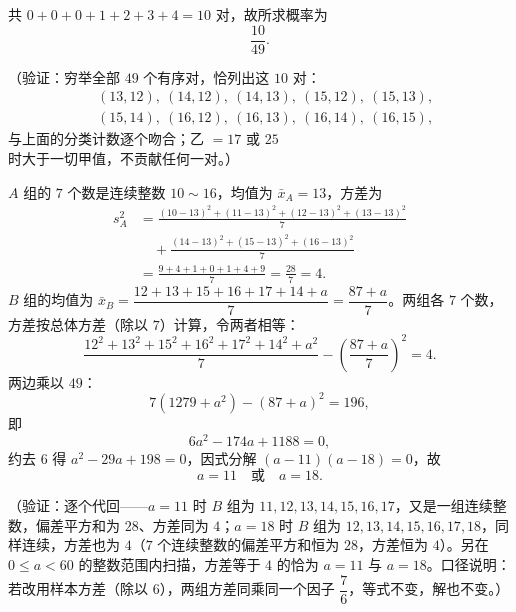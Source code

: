 \begin{answer}
共 \(0+0+0+1+2+3+4=10\) 对，故所求概率为
\nopagebreak[4]
\[
\frac{10}{49}.
\]

（验证：穷举全部 \(49\) 个有序对，恰列出这 \(10\) 对：
\nopagebreak[4]
\[
\begin{aligned}
&(13,12),\ (14,12),\ (14,13),\ (15,12),\ (15,13),\\
&(15,14),\ (16,12),\ (16,13),\ (16,14),\ (16,15),
\end{aligned}
\]
与上面的分类计数逐个吻合；乙 \(=17\) 或 \(25\) 时大于一切甲值，不贡献任何一对。）


\(A\) 组的 \(7\) 个数是连续整数 \(10\sim16\)，均值为 \(\bar{x}_{A}=13\)，方差为
\nopagebreak[4]
\[
\begin{aligned}
s_{A}^{2}&=\frac{(10-13)^{2}+(11-13)^{2}+(12-13)^{2}+(13-13)^{2}}{7}\\
&\quad+\frac{(14-13)^{2}+(15-13)^{2}+(16-13)^{2}}{7}\\
&=\frac{9+4+1+0+1+4+9}{7}=\frac{28}{7}=4 .
\end{aligned}
\]
\(B\) 组的均值为 \(\bar{x}_{B}=\dfrac{12+13+15+16+17+14+a}{7}=\dfrac{87+a}{7}\)。两组各 \(7\) 个数，方差按总体方差（除以 \(7\)）计算，令两者相等：
\nopagebreak[4]
\[
\frac{12^{2}+13^{2}+15^{2}+16^{2}+17^{2}+14^{2}+a^{2}}{7}-\left(\frac{87+a}{7}\right)^{2}=4 .
\]
两边乘以 \(49\)：
\nopagebreak[4]
\[
7(1279+a^{2})-(87+a)^{2}=196,
\]
即
\nopagebreak[4]
\[
6a^{2}-174a+1188=0,
\]
约去 \(6\) 得 \(a^{2}-29a+198=0\)，因式分解 \((a-11)(a-18)=0\)，故
\nopagebreak[4]
\[
a=11\quad\text{或}\quad a=18 .
\]

（验证：逐个代回——\(a=11\) 时 \(B\) 组为 \(11,12,13,14,15,16,17\)，又是一组连续整数，偏差平方和为 \(28\)、方差同为 \(4\)；\(a=18\) 时 \(B\) 组为 \(12,13,14,15,16,17,18\)，同样连续，方差也为 \(4\)（\(7\) 个连续整数的偏差平方和恒为 \(28\)，方差恒为 \(4\)）。另在 \(0\leqslant a<60\) 的整数范围内扫描，方差等于 \(4\) 的恰为 \(a=11\) 与 \(a=18\)。口径说明：若改用样本方差（除以 \(6\)），两组方差同乘同一个因子 \(\dfrac{7}{6}\)，等式不变，解也不变。）




\end{answer}
